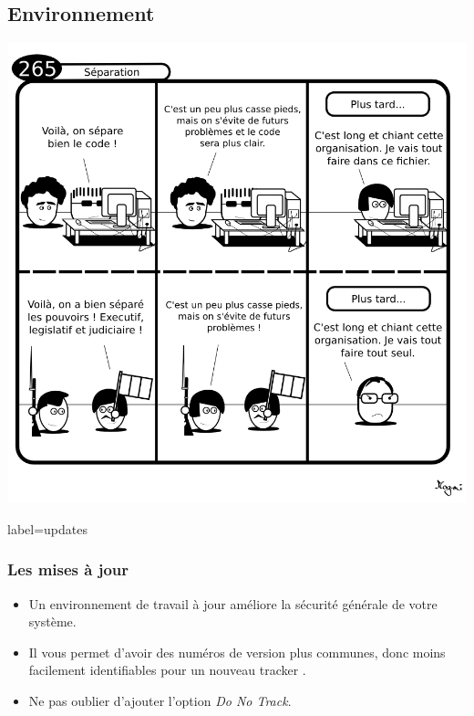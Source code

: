 \documentclass{beamer}
\begin{document}
    \subsection{Environnement}
        \begin{frame}
            \begin{center}
                \includegraphics[scale=0.35]{img/265-separation.png}
            \end{center}
        \end{frame}
        \begin{frame}{label=updates}
            \frametitle{Les mises à jour}
            \begin{center}
                \begin{itemize}
                    \item Un environnement de travail à jour améliore la sécurité générale de votre système.
                    \item Il vous permet d'avoir des numéros de version plus communes, donc moins facilement identifiables pour un nouveau tracker \cite{unique}.
                    \item Ne pas oublier d'ajouter l'option \textit{Do No Track}.
                \end{itemize}
            \end{center}
        \end{frame}
\end{document}
